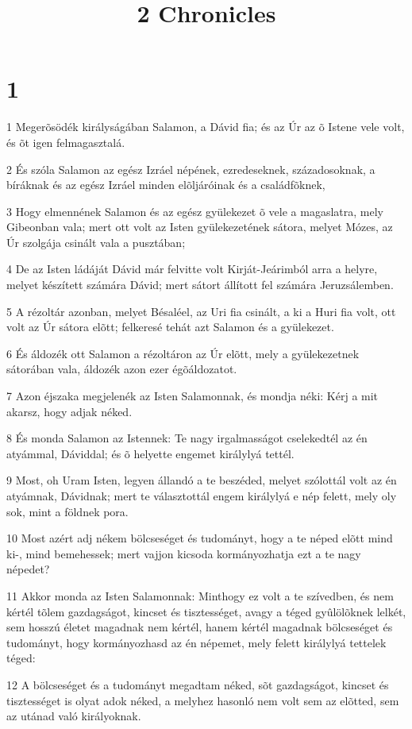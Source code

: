

\title{2 Chronicles}


\chapter{1}

\par 1 Megerõsödék királyságában Salamon, a Dávid fia; és az Úr az õ Istene vele volt, és õt igen felmagasztalá.
\par 2 És szóla Salamon az egész Izráel népének, ezredeseknek, századosoknak, a bíráknak és az egész Izráel minden elõljáróinak és a családfõknek,
\par 3 Hogy elmennének Salamon és az egész gyülekezet õ vele a magaslatra, mely Gibeonban vala; mert ott volt az Isten gyülekezetének sátora, melyet Mózes, az Úr szolgája csinált vala a pusztában;
\par 4 De az Isten ládáját Dávid már felvitte volt Kirját-Jeárimból arra a helyre, melyet készített számára Dávid; mert sátort állított fel számára Jeruzsálemben.
\par 5 A rézoltár azonban, melyet Bésaléel, az Uri fia csinált, a ki a Huri fia volt, ott volt az Úr sátora elõtt; felkeresé tehát azt Salamon és a gyülekezet.
\par 6 És áldozék ott Salamon a rézoltáron az Úr elõtt, mely a gyülekezetnek sátorában vala, áldozék azon ezer égõáldozatot.
\par 7 Azon éjszaka megjelenék az Isten Salamonnak, és mondja néki: Kérj a mit akarsz, hogy adjak néked.
\par 8 És monda Salamon az Istennek: Te nagy irgalmasságot cselekedtél az én atyámmal, Dáviddal; és õ helyette engemet királylyá tettél.
\par 9 Most, oh Uram Isten, legyen állandó a te beszéded, melyet szólottál volt az én atyámnak, Dávidnak; mert te választottál engem királylyá e nép felett, mely oly sok, mint a földnek pora.
\par 10 Most azért adj nékem bölcseséget és tudományt, hogy a te néped elõtt mind ki-, mind bemehessek; mert vajjon kicsoda  kormányozhatja ezt a te nagy népedet?
\par 11 Akkor monda az Isten Salamonnak: Minthogy ez volt a te szívedben, és nem kértél tõlem gazdagságot, kincset és tisztességet, avagy a téged gyûlölõknek lelkét, sem hosszú életet magadnak nem kértél, hanem kértél magadnak bölcseséget és tudományt, hogy kormányozhasd az én népemet, mely felett királylyá tettelek téged:
\par 12 A bölcseséget és a tudományt megadtam néked, sõt gazdagságot, kincset és tisztességet is olyat adok néked, a melyhez hasonló nem volt sem az elõtted, sem az utánad való királyoknak.

